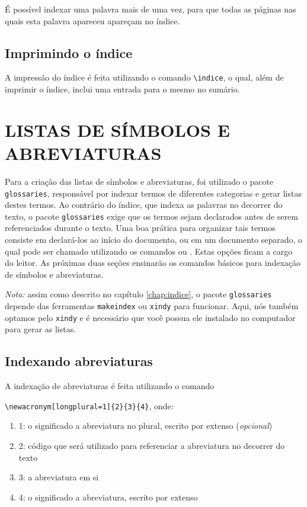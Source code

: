 \documentclass{fei}
\begin{document}
	É possível indexar uma palavra mais de uma vez, para que todas as páginas nas quais esta palavra apareceu apareçam no índice.
	
	\section{Imprimindo o índice}

	A impressão do índice é feita utilizando o comando \verb+\indice+, o qual, além de imprimir o índice, inclui uma entrada para o mesmo no sumário.

	\chapter{LISTAS DE SÍMBOLOS E ABREVIATURAS} \label{chap:listas}
	
	Para a criação das listas de símbolos e abreviaturas, foi utilizado o pacote \verb+glossaries+, responsável por indexar termos de diferentes categorias e gerar listas destes termos. Ao contrário do índice, que indexa as palavras no decorrer do texto, o pacote \verb+glossaries+ exige que os termos sejam declarados antes de serem referenciados durante o texto. Uma boa prática para organizar tais termos consiste em declará-los ao início do documento, ou em um documento separado, o qual pode ser chamado utilizando os comandos \verb++ ou \verb++. Estas opções ficam a cargo do leitor. As próximas duas seções ensinarão os comandos básicos para indexação de símbolos e abreviaturas.
	
	\emph{Nota:} assim como descrito no capítulo \ref{chap:indice}, o pacote \texttt{glossaries} depende das ferramentas \texttt{makeindex} ou \texttt{xindy} para funcionar. Aqui, nós também optamos pelo \texttt{xindy} e é necessário que você possua ele instalado no computador para gerar as listas.
	
	\section{Indexando abreviaturas}
	
	A indexação de abreviaturas é feita utilizando o comando
	
	\verb+\newacronym[longplural=1]{2}{3}{4}+, onde:
	
	\begin{enumerate}
	\item 1: o significado a abreviatura no plural, escrito por extenso (\emph{opcional})
	\item 2: código que será utilizado para referenciar a abreviatura no decorrer do texto
	\item 3: a abreviatura em si
	\item 4: o significado a abreviatura, escrito por extenso
	\end{enumerate}
	
\end{document}
